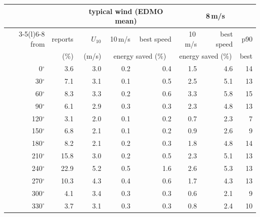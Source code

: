 \footnotesize\begin{tabular}{@{}rr rrr rrr@{}}
\toprule
 & & \multicolumn{3}{c}{typical wind (EDMO mean)} & \multicolumn{3}{c}{8\,m/s} \\
\cmidrule(lr){3-5}\cmidrule(l){6-8}
from & reports & $U_{10}$ & 10\,m/s & best speed & 10\,m/s & best speed & p90 \\
 & (\%) & (m/s) & \multicolumn{2}{c}{energy saved (\%)} & \multicolumn{2}{c}{energy saved (\%)} & best \\
\midrule
0$^\circ$ & 3.6 & 3.0 & 0.2 & 0.4 & 1.5 & 4.6 & 14 \\
30$^\circ$ & 7.1 & 3.1 & 0.1 & 0.5 & 2.5 & 5.1 & 13 \\
60$^\circ$ & 8.3 & 3.3 & 0.2 & 0.6 & 3.3 & 5.8 & 15 \\
90$^\circ$ & 6.1 & 2.9 & 0.3 & 0.3 & 2.3 & 4.8 & 13 \\
120$^\circ$ & 3.1 & 2.0 & 0.1 & 0.2 & 0.7 & 2.3 & 7 \\
150$^\circ$ & 6.8 & 2.1 & 0.1 & 0.2 & 0.9 & 2.6 & 9 \\
180$^\circ$ & 8.2 & 2.1 & 0.2 & 0.3 & 1.8 & 4.8 & 14 \\
210$^\circ$ & 15.8 & 3.0 & 0.2 & 0.5 & 2.3 & 5.1 & 13 \\
240$^\circ$ & 22.9 & 5.2 & 0.5 & 1.6 & 2.6 & 5.3 & 13 \\
270$^\circ$ & 10.3 & 4.3 & 0.4 & 0.6 & 1.7 & 4.3 & 13 \\
300$^\circ$ & 4.1 & 3.4 & 0.3 & 0.3 & 0.6 & 2.1 & 9 \\
330$^\circ$ & 3.7 & 3.1 & 0.3 & 0.3 & 0.8 & 2.4 & 10 \\
\bottomrule
\end{tabular}
